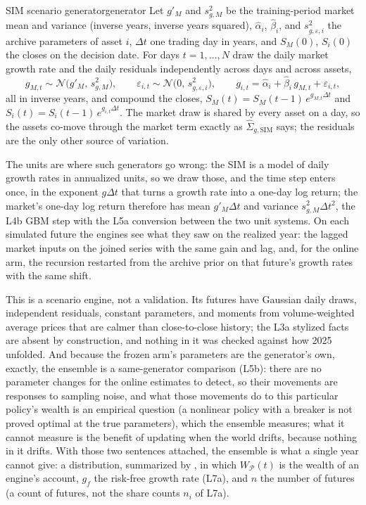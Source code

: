 \documentclass[11pt]{article}
\newcommand{\WP}{W_{\mathcal P}}
\newcommand{\SigSIM}{\hat\Sigma_{g,\mathrm{SIM}}}
\begin{document}
\begin{definition}{SIM scenario generator}{generator}
Let $g'_M$ and $s^2_{g,M}$ be the training-period market mean and variance (inverse years, inverse years squared), $\hat\alpha_i$, $\hat\beta_i$, and $s^2_{g,\varepsilon,i}$ the archive parameters of asset $i$, $\Delta t$ one trading day in years, and $S_M(0)$, $S_i(0)$ the closes on the decision date. For days $t=1,\ldots,N$ draw the daily market growth rate and the daily residuals independently across days and across assets,
\begin{equation}
  \label{eq:generator}
  g_{M,t}\sim\mathcal N\bigl(g'_M,\,s^2_{g,M}\bigr),\qquad
  \varepsilon_{i,t}\sim\mathcal N\bigl(0,\,s^2_{g,\varepsilon,i}\bigr),\qquad
  g_{i,t}=\hat\alpha_i+\hat\beta_i\,g_{M,t}+\varepsilon_{i,t},
\end{equation}
all in inverse years, and compound the closes, $S_M(t)=S_M(t-1)\,e^{g_{M,t}\Delta t}$ and $S_i(t)=S_i(t-1)\,e^{g_{i,t}\Delta t}$. The market draw is shared by every asset on a day, so the assets co-move through the market term exactly as $\SigSIM$ says; the residuals are the only other source of variation.
\end{definition}

The units are where such generators go wrong: the SIM is a model of daily growth rates in annualized units, so we draw those, and the time step enters once, in the exponent $g\Delta t$ that turns a growth rate into a one-day log return; the market's one-day log return therefore has mean $g'_M\Delta t$ and variance $s^2_{g,M}\Delta t^2$, the L4b GBM step with the L5a conversion between the two unit systems. On each simulated future the engines see what they saw on the realized year: the lagged market inputs on the joined series with the same gain and lag, and, for the online arm, the recursion restarted from the archive prior on that future's growth rates with the same shift.

This is a scenario engine, not a validation. Its futures have Gaussian daily draws, independent residuals, constant parameters, and moments from volume-weighted average prices that are calmer than close-to-close history; the L3a stylized facts are absent by construction, and nothing in it was checked against how 2025 unfolded. And because the frozen arm's parameters are the generator's own, exactly, the ensemble is a same-generator comparison (L5b): there are no parameter changes for the online estimates to detect, so their movements are responses to sampling noise, and what those movements do to this particular policy's wealth is an empirical question (a nonlinear policy with a breaker is not proved optimal at the true parameters), which the ensemble measures; what it cannot measure is the benefit of updating when the world drifts, because nothing in it drifts. With those two sentences attached, the ensemble is what a single year cannot give: a distribution, summarized by , in which $\WP(t)$ is the wealth of an engine's account, $g_f$ the risk-free growth rate (L7a), and $n$ the number of futures (a count of futures, not the share counts $n_i$ of L7a).
\end{document}
